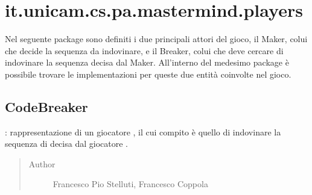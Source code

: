 \documentclass[letterpaper,10pt,italian,openany,oneside]{sphinxmanual}
\begin{document}
\section{it.unicam.cs.pa.mastermind.players}
\label{\detokenize{source/it/unicam/cs/pa/mastermind/players/package-index:it-unicam-cs-pa-mastermind-players}}\label{\detokenize{source/it/unicam/cs/pa/mastermind/players/package-index::doc}}
Nel seguente package sono definiti i due principali attori del gioco, il Maker, colui che decide la sequenza da indovinare, e il Breaker, colui che deve cercare di indovinare la sequenza decisa dal Maker. All’interno del medesimo package è possibile trovare le implementazioni per queste due entità coinvolte nel gioco.

\label{\detokenize{source/it/unicam/cs/pa/mastermind/players/package-index:package-it.unicam.cs.pa.mastermind.players}}

\subsection{CodeBreaker}
\label{\detokenize{source/it/unicam/cs/pa/mastermind/players/CodeBreaker:codebreaker}}\label{\detokenize{source/it/unicam/cs/pa/mastermind/players/CodeBreaker::doc}}

\begin{fulllineitems}
\label{\detokenize{source/it/unicam/cs/pa/mastermind/players/CodeBreaker:it.unicam.cs.pa.mastermind.players.CodeBreaker}}
: rappresentazione di un giocatore , il cui compito è quello di indovinare la sequenza di  decisa dal giocatore .
\begin{quote}\begin{description}
\item[{Author}] \leavevmode
Francesco Pio Stelluti, Francesco Coppola

\end{description}\end{quote}

\end{fulllineitems}
\end{document}
